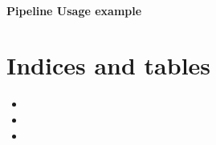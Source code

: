 \documentclass[letterpaper,10pt,english]{sphinxmanual}
\begin{document}
\subsubsection{Pipeline Usage example}
\label{\detokenize{neural_net_example:pipeline-usage-example}}\label{\detokenize{neural_net_example::doc}}
\begin{sphinxVerbatim}[commandchars=\\\{\}]

\end{sphinxVerbatim}


\chapter{Indices and tables}
\label{\detokenize{index:indices-and-tables}}\begin{itemize}
\item {} 

\item {} 

\item {} 

\end{itemize}
\end{document}
